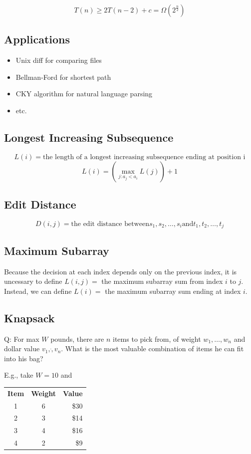 \documentclass[12pt,a4paper]{article}
\begin{document}
\[T(n) \geq 2T(n-2) + c = \Omega(2^{\frac{n}{2}})\]

\subsection*{Applications}

\begin{itemize}
  \item Unix diff for comparing files
  \item Bellman-Ford for shortest path
  \item CKY algorithm for natural language parsing
  \item etc.
\end{itemize}

\subsection*{Longest Increasing Subsequence}

\[L(i) = \text{the length of a longest increasing subsequence ending at position i}\]
\[L(i) = (\max_{j:a_j < a_i}{L(j)})+1\]

\subsection*{Edit Distance}

\[D(i, j) = \text{the edit distance between} s_1,s_2,\dots,s_i \text{and} t_1,t_2,\dots,t_j\]

\subsection*{Maximum Subarray}

Because the decision at each index depends only on the previous index,
it is uncessary to define $L(i, j) = $ the maximum subarray sum from index $i$ to $j$.
Instead, we can define $L(i) = $ the maximum subarray sum ending at index $i$.

\subsection*{Knapsack}

Q: For max $W$ pounds, there are $n$ items to pick from, of weight $w_1, \dots, w_n$ and dollar value $v_1, \dot, v_n$. 
What is the most valuable combination of items he can fit into his bag?

E.g., take $W = 10$ and 

\begin{table}[h]
    \centering
    \begin{tabular}{c c r}
        \textbf{Item} & \textbf{Weight} & \textbf{Value} \\
        1 & 6 & \$30 \\
        2 & 3 & \$14 \\
        3 & 4 & \$16 \\
        4 & 2 & \$9 \\
    \end{tabular}
\end{table}
\end{document}
